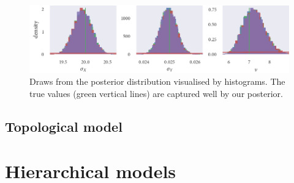 \begin{figure}[tbp]
  \includegraphics{stan_gauss_hist.pdf}
  \caption{Draws from the posterior distribution visualised by histograms. The true values
      (green vertical lines) are captured well by our posterior. 
}
  \label{fig:gauss_sim_study_hists}
\end{figure}

\subsection{Topological model}

\section{Hierarchical models}
